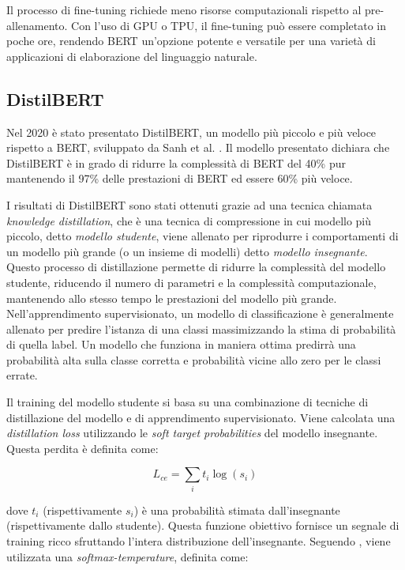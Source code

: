 \documentclass[../../Thesis.tex]{subfiles}
\begin{document}
Il processo di fine-tuning richiede meno risorse computazionali rispetto al pre-allenamento. Con l'uso di GPU o TPU, il fine-tuning pu\`o essere completato in poche ore, rendendo BERT un'opzione potente e versatile per una variet\`a di applicazioni di elaborazione del linguaggio naturale.

\subsection{DistilBERT}
Nel 2020 \`e stato presentato DistilBERT, un modello pi\`u piccolo e pi\`u veloce rispetto a BERT, sviluppato da Sanh et al. \cite{DistilBERT}. Il modello presentato dichiara che DistilBERT \`e in grado di ridurre la complessit\`a di BERT del 40\% pur mantenendo il 97\% delle prestazioni di BERT ed essere 60\% pi\`u veloce. 

I risultati di DistilBERT sono stati ottenuti grazie ad una tecnica chiamata \emph{knowledge distillation}, che \`e una tecnica di compressione in cui modello pi\`u piccolo, detto \emph{modello studente}, viene allenato per riprodurre i comportamenti di un modello pi\`u grande (o un insieme di modelli) detto \emph{modello insegnante}. Questo processo di distillazione permette di ridurre la complessit\`a del modello studente, riducendo il numero di parametri e la complessit\`a computazionale, mantenendo allo stesso tempo le prestazioni del modello pi\`u grande. Nell'apprendimento supervisionato, un modello di classificazione \`e generalmente allenato per predire l'istanza di una classi massimizzando la stima di probabilit\`a di quella label. Un modello che funziona in maniera ottima predirr\`a una probabilit\`a alta sulla classe corretta e probabilit\`a vicine allo zero per le classi errate. 

Il training del modello studente si basa su una combinazione di tecniche di distillazione del modello e di apprendimento supervisionato. Viene calcolata una  \textit{distillation loss} utilizzando le \textit{soft target probabilities} del modello insegnante. Questa perdita \`e definita come:

$$
L_{ce} = \sum_i t_i \log(s_i)
$$

dove $t_i$ (rispettivamente $s_i$) \`e una probabilit\`a stimata dall'insegnante (rispettivamente dallo studente). Questa funzione obiettivo fornisce un segnale di training ricco sfruttando l'intera distribuzione dell'insegnante. Seguendo \cite{hinton2015distilling}, viene utilizzata una \textit{softmax-temperature}, definita come:
\end{document}
